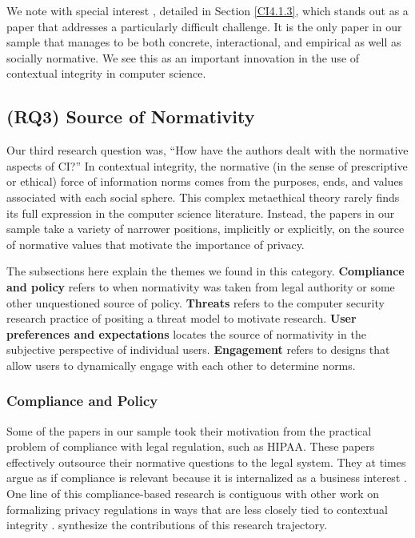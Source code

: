 \documentclass[../thesis.tex]{subfiles}
\begin{document}
We note with special interest \citet{criado2015implicit},
detailed in Section \ref{CI4.1.3},
which stands out as a paper that addresses a particularly difficult
challenge. It is the only paper in our sample that manages to be both
concrete, interactional, and empirical as well as socially normative.
We see this as an important innovation in the use of contextual
integrity in computer science.

\subsection{(RQ3) Source of Normativity}
\label{CI4.3}

Our third research question was, ``How have the authors
dealt with the normative aspects of CI?'' In
contextual integrity, the normative (in the sense of prescriptive or
ethical) force of information norms comes from the purposes, ends, and
values associated with each social sphere. This complex metaethical
theory rarely finds its full expression in the computer science
literature. Instead, the papers in our sample take a variety of
narrower positions, implicitly or explicitly, on the source of
normative values that motivate the importance of privacy.

The subsections here explain the themes we found in this category.
\textbf{Compliance and policy} refers to when normativity was taken
from legal authority or some other unquestioned source of policy.
\textbf{Threats} refers to the computer security research practice of
positing a threat model to motivate research. \textbf{User preferences
and expectations} locates the source of normativity in the subjective
perspective of individual users. \textbf{Engagement} refers to designs
that allow users to dynamically engage with each other to determine
norms.

\subsubsection{Compliance and Policy}
\label{CI4.3.1}

Some of the papers in our sample took their motivation from the
practical problem of compliance with legal regulation, such as HIPAA.
These papers effectively outsource their normative questions to the
legal system. They at times argue as if compliance is relevant because
it is internalized as a business interest \cite{barth07csf}.
One line of this compliance-based research is contiguous with
other work on
formalizing privacy regulations in ways that are less closely tied to
contextual integrity \cite{DeYoungGJKD10}.
\citet{datta2011understanding} synthesize the contributions of this
research trajectory.
\end{document}
